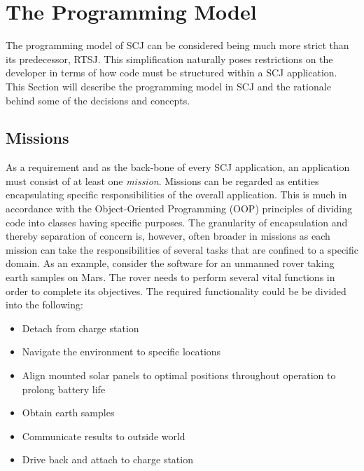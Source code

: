\section{The Programming Model}
\label{section:programmingmodel}
The programming model of SCJ can be considered being much more strict than its predecessor, RTSJ. This simplification naturally poses restrictions on the developer in terms of how code must be structured within a SCJ application. 
This Section will describe the programming model in SCJ and the rationale behind some of the decisions and concepts.


\subsection{Missions}
As a requirement and as the back-bone of every SCJ application, an application must consist of at least one \textit{mission}. Missions can be regarded as entities encapsulating specific responsibilities of the overall application. This is much in accordance with the Object-Oriented Programming (OOP) principles of dividing code into classes having specific purposes. The granularity of encapsulation and thereby separation of concern is, however, often broader in missions as each mission can take the responsibilities of several tasks that are confined to a specific domain. As an example, consider the software for an unmanned rover taking earth samples on Mars. The rover needs to perform several vital functions in order to complete its objectives. The required functionality could be be divided into the following:

\begin{itemize}
	\item Detach from charge station
	\item Navigate the environment to specific locations
	\item Align mounted solar panels to optimal positions throughout operation to prolong battery life
	\item Obtain earth samples
	\item Communicate results to outside world
	\item Drive back and attach to charge station
\end{itemize}

